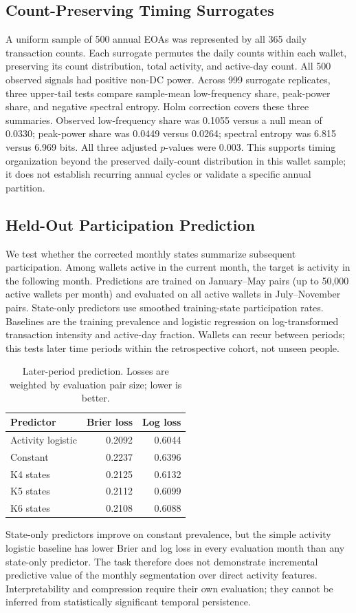 \subsection{Count-Preserving Timing Surrogates}
A uniform sample of 500 annual EOAs was represented by all 365 daily transaction counts. Each surrogate permutes the daily counts within each wallet, preserving its count distribution, total activity, and active-day count. All 500 observed signals had positive non-DC power. Across 999 surrogate replicates, three upper-tail tests compare sample-mean low-frequency share, peak-power share, and negative spectral entropy. Holm correction covers these three summaries.
Observed low-frequency share was 0.1055 versus a null mean of 0.0330; peak-power share was 0.0449 versus 0.0264; spectral entropy was 6.815 versus 6.969 bits. All three adjusted $p$-values were 0.003. This supports timing organization beyond the preserved daily-count distribution in this wallet sample; it does not establish recurring annual cycles or validate a specific annual partition.
\subsection{Held-Out Participation Prediction}
We test whether the corrected monthly states summarize subsequent participation. Among wallets active in the current month, the target is activity in the following month. Predictions are trained on January--May pairs (up to 50,000 active wallets per month) and evaluated on all active wallets in July--November pairs. State-only predictors use smoothed training-state participation rates. Baselines are the training prevalence and logistic regression on log-transformed transaction intensity and active-day fraction. Wallets can recur between periods; this tests later time periods within the retrospective cohort, not unseen people.
\begin{table}[t]\centering\caption{Later-period prediction. Losses are weighted by evaluation pair size; lower is better.}\small
\begin{tabular}{lrr}\toprule Predictor & Brier loss & Log loss \\\midrule
Activity logistic & 0.2092 & 0.6044 \\
Constant & 0.2237 & 0.6396 \\
K4 states & 0.2125 & 0.6132 \\
K5 states & 0.2112 & 0.6099 \\
K6 states & 0.2108 & 0.6088 \\
\bottomrule\end{tabular}\end{table}
State-only predictors improve on constant prevalence, but the simple activity logistic baseline has lower Brier and log loss in every evaluation month than any state-only predictor. The task therefore does not demonstrate incremental predictive value of the monthly segmentation over direct activity features. Interpretability and compression require their own evaluation; they cannot be inferred from statistically significant temporal persistence.
